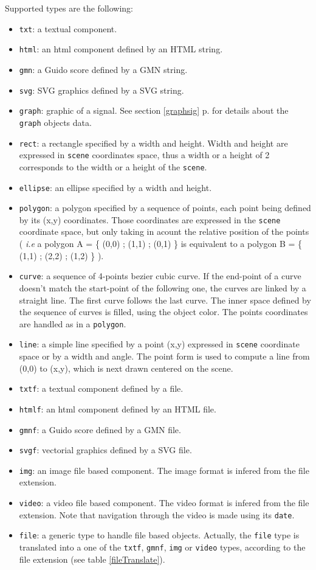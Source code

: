 \documentclass[a4paper,twoside]{report}
\newcommand{\fullref}[1]	{\ref{#1} p.\pageref{#1}}
\newcommand{\OSC}[1]		{\texttt{#1}}
\begin{document}
Supported types are the following:
\begin{itemize}
\item \OSC{txt}: a textual component.
\item \OSC{html}: an html component defined by an HTML string.
\item \OSC{gmn}: a Guido score defined by a GMN string.
\item \OSC{svg}: SVG graphics defined by a SVG string.
\item \OSC{graph}: graphic of a signal. See section \fullref{graphsig} for details about the \OSC{graph} objects data.
\item \OSC{rect}: a rectangle specified by a width and height. Width and height are expressed in \OSC{scene} coordinates space, thus a width or a height of 2 corresponds to the width or a height of the \OSC{scene}.
\item \OSC{ellipse}: an ellipse specified by a width and height.
\item \OSC{polygon}: a polygon specified by a sequence of points, each point being defined by its (x,y) coordinates. Those coordinates are expressed in the \OSC{scene} coordinate space, but only taking in acount the relative position of the points ( \emph{i.e} a polygon A = \{ (0,0) ; (1,1) ; (0,1) \} is equivalent to a polygon B = \{ (1,1) ; (2,2) ; (1,2) \} ).
\item \OSC{curve}: a sequence of 4-points bezier cubic curve. If the end-point of a curve doesn't match the start-point of the following one, the curves are linked by a straight line. The first curve follows the last curve. The inner space defined by the sequence of curves is filled, using the object color. The points coordinates are handled as in a \OSC{polygon}.
\item \OSC{line}: a simple line specified by a point (x,y) expressed in \OSC{scene} coordinate space or by a width and angle. The point form is used to compute a line from (0,0) to (x,y), which is next drawn centered on the scene.
\item \OSC{txtf}: a textual component defined by a file.
\item \OSC{htmlf}: an html component defined by an HTML file.
\item \OSC{gmnf}: a Guido score defined by a GMN file.
\item \OSC{svgf}: vectorial graphics defined by a SVG file.
\item \OSC{img}: an image file based component. The image format is infered from the file extension.
\item \OSC{video}: a video file based component. The video format is infered from the file extension. Note that navigation through the video is made using its \OSC{date}.
\item \OSC{file}: a generic type to handle file based objects. Actually, the \OSC{file} type is translated into a one of the \OSC{txtf}, \OSC{gmnf}, \OSC{img} or \OSC{video} types, according to the file extension (see table \ref{fileTranslate}).
\end{itemize}
\end{document}
